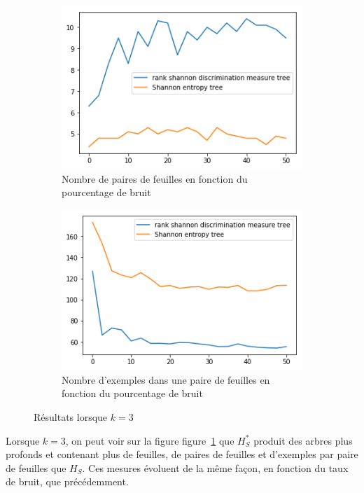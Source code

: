 \documentclass[a4paper]{article}
\newcommand{\figref}[1]{figure~\ref{#1}}
\begin{document}
\begin{figure}[H]
    \begin{subfigure}[c]{0.46\textwidth}
        \centering
        \includegraphics[width=\textwidth]{images/nbpairs_3.png}
        \caption{Nombre de paires de feuilles en fonction du pourcentage de bruit}
    \end{subfigure}
    \begin{subfigure}[c]{0.46\textwidth}
        \centering
        \includegraphics[width=\textwidth]{images/nbexamples_3.png}
        \caption{Nombre d'exemples dans une paire de feuilles en fonction du pourcentage de bruit}
    \end{subfigure}

    \caption{Résultats lorsque $k=3$}
    \label{results:artificial3}
\end{figure}

Lorsque $k=3$, on peut voir sur la figure \figref{results:artificial3} que
$H^*_S$ produit des arbres plus profonds et contenant plus de feuilles, de
paires de feuilles et d'exemples par paire de feuilles que $H_S$. Ces mesures
évoluent de la même façon, en fonction du taux de bruit, que précédemment.
\end{document}
